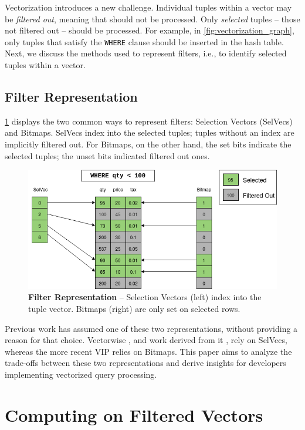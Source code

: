 \documentclass[12pt]{cmuthesis}
\begin{document}
Vectorization introduces a new challenge. Individual tuples within a vector may be \textit{filtered out}, meaning that should not be processed. Only \textit{selected} tuples -- those not filtered out -- should be processed. For example, in \cref{fig:vectorization_graph}, only tuples that satisfy the \texttt{WHERE} clause should be inserted in the hash table. Next, we discuss the methods used to represent filters, i.e., to identify selected tuples within a vector.



\section{Filter Representation}
\cref{fig:repr_intro} displays the two common ways to represent filters: Selection Vectors (SelVecs) and Bitmaps. SelVecs index into the selected tuples; tuples without an index are implicitly filtered out. For Bitmaps, on the other hand, the set bits indicate the selected tuples; the unset bits indicated filtered out ones.
\begin{figure}[t!]
    \centering
    \includegraphics[scale=0.7]{images/FilterRepresentationIntro.png}
    \caption{\textbf{Filter Representation} -- Selection Vectors (left) index into the tuple vector. Bitmaps (right) are only set on selected rows.}
    \label{fig:repr_intro}
\end{figure}
Previous work has assumed one of these two representations, without providing a reason for that choice. Vectorwise \cite{vectorwise}, and work derived from it \cite{miro_adapt, everything_vectorized, sompolski_vec},  rely on SelVecs, whereas the more recent VIP \cite{orestis_bitmap} relies on Bitmaps. This paper aims to analyze the trade-offs between these two representations and derive insights for developers implementing vectorized query processing.


\chapter{Computing on Filtered Vectors}
\end{document}
